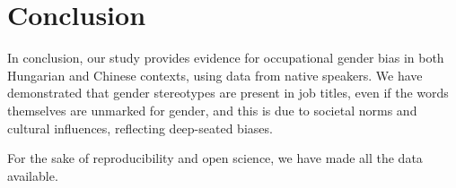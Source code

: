 \documentclass[11pt]{article}
\begin{document}



\section{Conclusion}

In conclusion, our study provides evidence for occupational gender bias in both Hungarian and Chinese contexts, using data from native speakers. We have demonstrated that gender stereotypes are present in job titles, even if the words themselves are unmarked for gender, and this is due to societal norms and cultural influences, reflecting deep-seated biases.

For the sake of reproducibility and open science, we have made all the data available.



\end{document}
